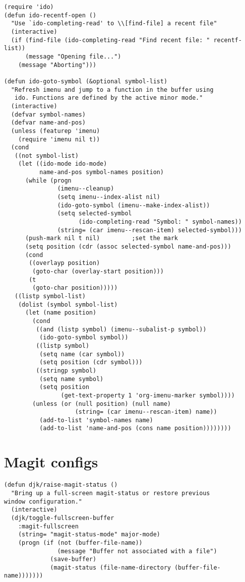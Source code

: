 \documentclass[11pt]{article}
\begin{document}
\begin{verbatim}
(require 'ido)      
(defun ido-recentf-open ()
  "Use `ido-completing-read' to \\[find-file] a recent file"
  (interactive)
  (if (find-file (ido-completing-read "Find recent file: " recentf-list))
      (message "Opening file...")
    (message "Aborting")))

(defun ido-goto-symbol (&optional symbol-list)
  "Refresh imenu and jump to a function in the buffer using
   ido. Functions are defined by the active minor mode."
  (interactive)
  (defvar symbol-names)
  (defvar name-and-pos)
  (unless (featurep 'imenu)
    (require 'imenu nil t))
  (cond
   ((not symbol-list)
    (let ((ido-mode ido-mode)
          name-and-pos symbol-names position)
      (while (progn
               (imenu--cleanup)
               (setq imenu--index-alist nil)
               (ido-goto-symbol (imenu--make-index-alist))
               (setq selected-symbol
                     (ido-completing-read "Symbol: " symbol-names))
               (string= (car imenu--rescan-item) selected-symbol)))
      (push-mark nil t nil)         ;set the mark
      (setq position (cdr (assoc selected-symbol name-and-pos)))
      (cond
       ((overlayp position)
        (goto-char (overlay-start position)))
       (t
        (goto-char position)))))
   ((listp symbol-list)
    (dolist (symbol symbol-list)
      (let (name position)
        (cond
         ((and (listp symbol) (imenu--subalist-p symbol))
          (ido-goto-symbol symbol))
         ((listp symbol)
          (setq name (car symbol))
          (setq position (cdr symbol)))
         ((stringp symbol)
          (setq name symbol)
          (setq position
                (get-text-property 1 'org-imenu-marker symbol))))
        (unless (or (null position) (null name)
                    (string= (car imenu--rescan-item) name))
          (add-to-list 'symbol-names name)
          (add-to-list 'name-and-pos (cons name position))))))))
\end{verbatim}
\section{Magit configs}
\label{sec-8}


\begin{verbatim}
(defun djk/raise-magit-status ()
  "Bring up a full-screen magit-status or restore previous
window configuration."
  (interactive)
  (djk/toggle-fullscreen-buffer
    :magit-fullscreen
    (string= "magit-status-mode" major-mode)
    (progn (if (not (buffer-file-name))
               (message "Buffer not associated with a file")
             (save-buffer)
             (magit-status (file-name-directory (buffer-file-name)))))))
\end{verbatim}
\end{document}
